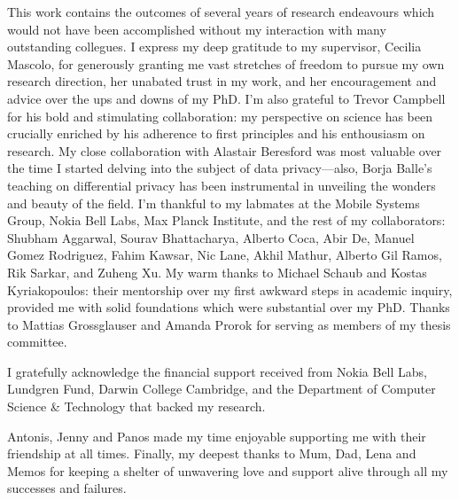 
\begin{acknowledgements}
This work contains the outcomes of several years of research endeavours which would not have been accomplished without my interaction with many outstanding collegues. I express my deep gratitude to my supervisor, Cecilia Mascolo, for generously granting me vast stretches of freedom to pursue my own research direction, her unabated trust in my work, and her encouragement and advice over the ups and downs of my PhD. I'm also grateful to Trevor Campbell for his bold and stimulating collaboration: my perspective on science has been crucially enriched by his adherence to first principles and his enthousiasm on research. My close collaboration with Alastair Beresford was most valuable over the time I started delving into the subject of data privacy---also, Borja Balle's teaching on differential privacy has been instrumental in unveiling the wonders and beauty of the field. I'm thankful to my labmates at the Mobile Systems Group, Nokia Bell Labs, Max Planck Institute, and the rest of my collaborators:
Shubham Aggarwal, Sourav Bhattacharya, Alberto Coca, Abir De, Manuel Gomez Rodriguez, Fahim Kawsar, Nic Lane,  Akhil Mathur, Alberto Gil Ramos, Rik Sarkar, and Zuheng Xu. My warm thanks to Michael Schaub and Kostas Kyriakopoulos: their mentorship over my first awkward steps in academic inquiry, provided me with solid foundations which were substantial over my PhD. Thanks to
Mattias Grossglauser and Amanda Prorok for serving as members of my thesis committee.

I gratefully acknowledge the financial support received from Nokia Bell Labs, Lundgren Fund, Darwin College Cambridge, and the Department of Computer Science \& Technology that backed my research. 

Antonis, Jenny and Panos made my time enjoyable supporting me with their friendship at all times. Finally, my deepest thanks to Mum, Dad, Lena and Memos for keeping a shelter of unwavering love and support alive through all my successes and failures.
\end{acknowledgements}

